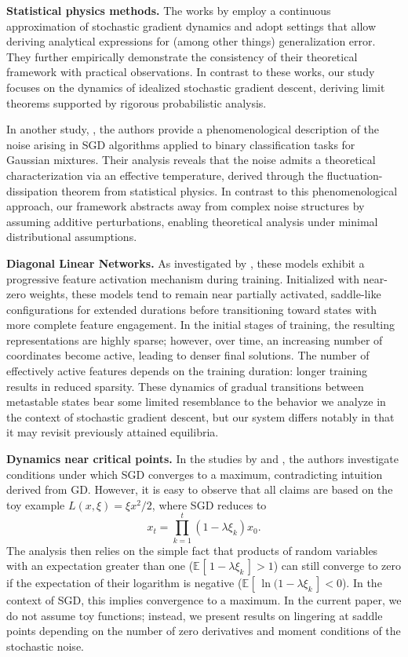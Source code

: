 \documentclass{article}
\theoremstyle{plain}
\theoremstyle{definition}
\theoremstyle{remark}
\newcommand{\e}[2][]{{\mathbb{E}_{#1}\left[ \, #2 \,\right] }} %
\begin{document}
\textbf{Statistical physics methods.} The works by \citet{mignacco2020dynamical,veiga2024stochastic} employ a continuous approximation of stochastic gradient dynamics and adopt settings that allow deriving analytical expressions for (among other things) generalization error. They further empirically demonstrate the consistency of their theoretical framework with practical observations. In contrast to these works, our study focuses on the dynamics of idealized stochastic gradient descent, deriving limit theorems supported by rigorous probabilistic analysis.

In another study, \cite{mignacco2022effective}, the authors provide a phenomenological description of the noise arising in SGD algorithms applied to binary classification tasks for Gaussian mixtures. Their analysis reveals that the noise admits a theoretical characterization via an effective temperature, derived through the fluctuation-dissipation theorem from statistical physics. In contrast to this phenomenological approach, our framework abstracts away from complex noise structures by assuming additive perturbations, enabling theoretical analysis under minimal distributional assumptions.



\textbf{Diagonal Linear Networks.} As investigated by \citet{berthier2023incremental}, these models exhibit a progressive feature activation mechanism during training. Initialized with near-zero weights, these models tend to remain near partially activated, saddle-like configurations for extended durations before transitioning toward states with more complete feature engagement. In the initial stages of training, the resulting representations are highly sparse; however, over time, an increasing number of coordinates become active, leading to denser final solutions. The number of effectively active features depends on the training duration: longer training results in reduced sparsity. These dynamics of gradual transitions between metastable states bear some limited resemblance to the behavior we analyze in the context of stochastic gradient descent, but our system differs notably in that it may revisit previously attained equilibria.

\textbf{Dynamics near critical points.}
In the studies by 
\citet{ziyin2023} and \citet{ziyin2024}, the  authors investigate conditions under which SGD converges to a maximum, contradicting intuition derived from GD. However, it is easy to observe that all claims are based on the toy example $L(x,\xi) = \xi x^2/2$, where SGD reduces to
    \[
        x_t = \prod\limits_{k=1}^{t} (1 - \lambda \xi_k)x_0.
    \]
    The analysis then relies on the simple fact that products of random variables with an expectation greater than one ($\e{1 - \lambda \xi_k} > 1$) can still converge to zero if the expectation of their logarithm is negative ($\e{ \ln (1 - \lambda \xi_k} < 0$). In the context of SGD, this implies convergence to a maximum.
In the current paper, we do not assume toy functions; instead, we present results on lingering at saddle points depending on the number of zero derivatives and moment conditions of the stochastic noise.
\end{document}
